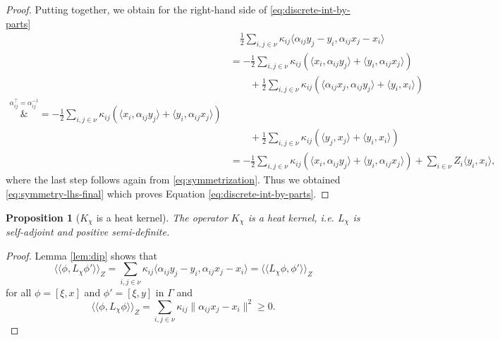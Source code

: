 \documentclass[10pt,reqno]{amsart}
\numberwithin{equation}{section}
\theoremstyle{bfnote}
\newtheorem{proposition}[theorem]{Proposition}
\theoremstyle{bfdef}
\newcommand{\la}{\langle}
\newcommand{\ra}{\rangle}
\newcommand{\lla}{\langle\langle}
\newcommand{\rra}{\rangle\rangle}
\providecommand\x; %
\renewcommand{\x}{x}
\providecommand\gt; %
\renewcommand{\gt}{\xi}
\providecommand\a; %
\renewcommand{\a}{\alpha}
\providecommand\hgen; %
\renewcommand{\hgen}{L}
\providecommand\vg; %
\renewcommand{\vg}{\chi}
\begin{document}
\begin{proof}
		Putting together, we obtain for the right-hand side of \eqref{eq:discrete-int-by-parts}
		\begin{subequations}\label{eq:symmetry-rhs}
			\begin{align}
				&\quad \frac{1}{2} \sum_{i,j \in \nu} \kappa_{ij} \la \a_{ij} y_{j} - y_{i}, \a_{ij} \x_j - \x_i \ra \\
				&=
				- \frac{1}{2}\sum_{i, j \in \nu} \kappa_{ij} (\la \x_i,\a_{ij}y_{j} \ra + \la y_i, \a_{ij} \x_{j}\ra) \\ &\qquad
				+ \frac{1}{2}\sum_{i,j\in \nu}  \kappa_{ij} (\la \a_{ij}x_j, \a_{ij} y_{j} \ra + \la y_{i},x_i \ra)  \\
				\overset{\alpha_{ij}^{\top}=\alpha_{ij}^{-1}}&{=}
				- \frac{1}{2}\sum_{i,j \in \nu}  \kappa_{ij} (\la \x_i,\a_{ij} y_{j} \ra + \la y_i, \a_{ij} \x_{j}\ra) \\ &\qquad
				 + \frac{1}{2}\sum_{i,j \in \nu}  \kappa_{ij} (\la y_{j}, \x_j \ra + \la y_{i},x_i \ra)  \\
				&=
				- \frac{1}{2}\sum_{i,j \in \nu}  \kappa_{ij} (\la \x_i,\a_{ij}y_{j} \ra + \la y_i, \a_{ij} \x_{j}\ra)
				+ \sum_{i \in \nu} Z_i \la y_{i},x_i \ra,
			\end{align}
		\end{subequations}
		where the last step follows again from \eqref{eq:symmetrization}. Thus we obtained \eqref{eq:symmetry-lhs-final} which proves Equation \eqref{eq:discrete-int-by-parts}.
		\end{proof}

		\begin{proposition}[$K_{\vg}$ is a heat kernel]
			The operator $K_{\vg}$ is a heat kernel, i.e. $\hgen_{\vg}$ is self-adjoint and positive semi-definite.
		\end{proposition}

		\begin{proof}
			Lemma \ref{lem:dip} shows that
			\begin{equation}
				\lla \phi , \hgen_{\vg} \phi' \rra_{Z}
				=
				\sum_{i,j \in \nu} \kappa_{ij} \la \a_{ij} y_{j} - y_{i},\a_{ij}x_j - \x_i \ra
				=
				\lla \hgen_{\vg} \phi, \phi' \rra_{Z}
			\end{equation}
			for all $\phi= [\gt,\x]$ and $\phi'=[\gt,y]$ in $\Gamma$ and
			\begin{equation}
				\lla \phi , \hgen_{\vg} \phi \rra_{Z} = \sum_{i,j \in \nu} \kappa_{ij} \|\a_{ij}x_j - \x_i \|^2 \geq 0.
			\end{equation}
		\end{proof}
\end{document}
